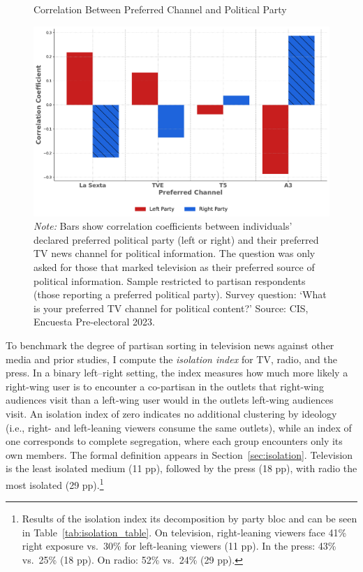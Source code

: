 \documentclass[12pt]{article}
\begin{document}
	
	\begin{figure}[!htbp]
		\centering
		\caption{Correlation Between Preferred Channel and Political Party}
		\includegraphics[width=120mm]{figures/corr_party_channel3}
		\caption*{\small \textit{Note:} Bars show correlation coefficients between individuals’ declared preferred political party (left or right) and their preferred TV news channel for political information. The question was only asked for those that marked television as their preferred source of political information. Sample restricted to partisan respondents (those reporting a preferred political party). Survey question: ‘What is your preferred TV channel for political content?’ Source: CIS, Encuesta Pre-electoral 2023.}
		\label{fig:opinion}
	\end{figure}
	
	

	
	
	
	To benchmark the degree of partisan sorting in television news against other media and prior studies, I compute the \emph{isolation index} \citep{gentzkow_isolation} for TV, radio, and the press. In a binary left–right setting, the index measures how much more likely a right-wing user is to encounter a co-partisan in the outlets that right-wing audiences visit than a left-wing user would in the outlets left-wing audiences visit. An isolation index of zero indicates no additional clustering by ideology (i.e., right- and left-leaning viewers consume the same outlets), while an index of one corresponds to complete segregation, where each group encounters only its own members.	The formal definition appears in  Section~\ref{sec:isolation}. Television is the least isolated medium (11 pp), followed by the press (18 pp), with radio the most isolated (29 pp).\footnote{Results of the isolation index its decomposition by party bloc and can be seen in  Table~\ref{tab:isolation_table}. On television, right-leaning viewers face 41\% right exposure vs.\ 30\% for left-leaning viewers (11 pp). In the press: 43\% vs.\ 25\% (18 pp). On radio: 52\% vs.\ 24\% (29 pp).}
	
\end{document}
